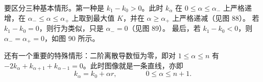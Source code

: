 要区分三种基本情形。第一种是 $k_1-k_0 > 0$。此时 $k_\alpha$ 在 $0\leq \alpha \leq \alpha_-$ 上严格递增，在 $\alpha_-\leq \alpha \leq \alpha_+$ 上取到最大值 $K$，并在 $\alpha \geq \alpha_+$ 上严格递减（见图 88）。%
若 $k_1 - k_0 = 0$，则行为类似，只是 $\alpha_- = 0$（见图 89）。%
最后，若 $k_1 - k_0 < 0$，则 $\alpha_- = \alpha_+ = 0$，如图 90 所示。%

还有一个重要的特殊情形：二阶离散导数恒为零，即对 $1 \leq \alpha \leq n$ 有 $-2k_\alpha + k_{\alpha+1} + k_{\alpha-1} = 0$。此时图像就是一条直线，亦即
\begin{equation}
k_\alpha = k_0 + \alpha r, \qquad\qquad 0 \leq \alpha \leq n+1.
\end{equation}
